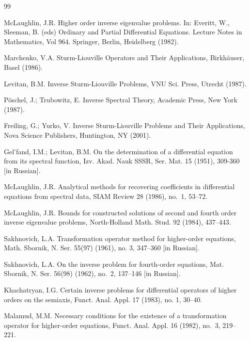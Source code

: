\documentclass[a4paper,12pt]{article}
\theoremstyle{plain}
\numberwithin{equation}{section}
\theoremstyle{definition}
\theoremstyle{remark}
\begin{document}
\begin{thebibliography}{99}


McLaughlin, J.R. Higher order inverse eigenvalue problems. In: Everitt, W., Sleeman, B. (eds) Ordinary and Partial Differential Equations. Lecture Notes in Mathematics, Vol 964. Springer, Berlin, Heidelberg (1982).

Marchenko, V.A. Sturm-Liouville Operators and Their Applications, Birkh\"auser, Basel (1986).

Levitan, B.M. Inverse Sturm-Liouville Problems, VNU Sci. Press, Utrecht (1987).

P\"{o}schel, J.; Trubowitz, E. Inverse Spectral Theory, Academic Press, New York (1987).

Freiling, G.; Yurko, V. Inverse Sturm-Liouville Problems and Their Applications, Nova Science Publishers, Huntington, NY (2001).

Gel'fand, I.M.; Levitan, B.M. On the determination of a differential equation from its spectral function, Izv. Akad. Nauk SSSR, Ser. Mat. 15 (1951), 309-360 [in Russian].

McLaughlin, J.R. Analytical methods for recovering coefficients in differential equations from spectral data, SIAM Review 28 (1986), no.~1, 53--72.

McLaughlin, J.R. Bounds for constructed solutions of second and fourth order inverse eigenvalue problems, North-Holland Math. Stud. 92 (1984), 437--443.


Sakhnovich, L.A. Transformation operator method for higher-order equations, Math. Sbornik, N. Ser. 55(97) (1961), no. 3, 347--360 [in Russian].

Sakhnovich, L.A. On the inverse problem for fourth-order equations, Mat. Sbornik, N. Ser. 56(98) (1962), no.~2, 137--146 [in Russian].

Khachatryan, I.G. Certain inverse problems for differential operators of higher orders on the semiaxis, Funct. Anal. Appl. 17 (1983), no. 1, 30--40.

Malamud, M.M. Necessary conditions for the existence of a transformation operator for higher-order equations, Funct. Anal. Appl. 16 (1982), no.~3, 219--221.


\end{thebibliography}
\end{document}
